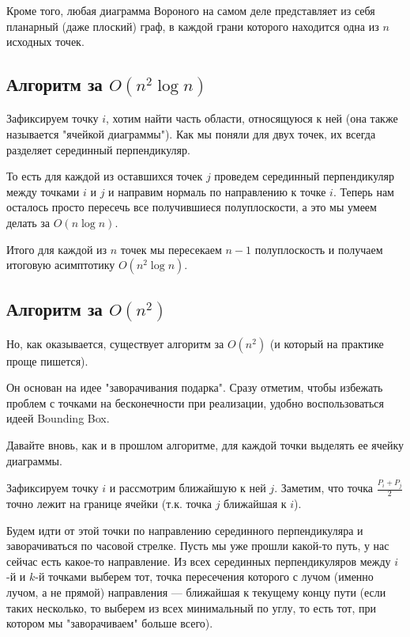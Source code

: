 Кроме того, любая диаграмма Вороного на самом деле представляет из себя планарный (даже плоский) граф, в каждой грани которого находится одна из $n$ исходных точек.

\subsection{Алгоритм за $O(n^2 \log n)$}
                                        
Зафиксируем точку $i$, хотим найти часть области, относящуюся к ней (она также называется "ячейкой диаграммы"). 
Как мы поняли для двух точек, их всегда разделяет серединный перпендикуляр. 

То есть для каждой из оставшихся точек $j$ проведем серединный перпендикуляр между точками $i$ и $j$ и направим нормаль по направлению к точке $i$.
Теперь нам осталось просто пересечь все получившиеся полуплоскости, а это мы умеем делать за $O(n \log n)$.

Итого для каждой из $n$ точек мы пересекаем $n-1$ полуплоскость и получаем итоговую асимптотику $O(n^2 \log n)$.

\subsection{Алгоритм за $O(n^2)$}

Но, как оказывается, существует алгоритм за $O(n^2)$ (и который на практике проще пишется).

Он основан на идее "заворачивания подарка".
Сразу отметим, чтобы избежать проблем с точками на бесконечности при реализации, удобно воспользоваться идеей Bounding Box.


Давайте вновь, как и в прошлом алгоритме, для каждой точки выделять ее ячейку диаграммы.

Зафиксируем точку $i$ и рассмотрим ближайшую к ней $j$. 
Заметим, что точка $\frac{P_i + P_j}{2}$ точно лежит на границе ячейки (т.к. точка $j$ ближайшая к $i$).

Будем идти от этой точки по направлению серединного перпендикуляра и заворачиваться по часовой стрелке.
Пусть мы уже прошли какой-то путь, у нас сейчас есть какое-то направление. 
Из всех серединных перпендикуляров между $i$-й и $k$-й точками выберем тот, точка пересечения которого с лучом (именно лучом, а не прямой) направления --- ближайшая к текущему концу пути 
(если таких несколько, то выберем из всех минимальный по углу, то есть тот, при котором мы "заворачиваем"{} больше всего).

